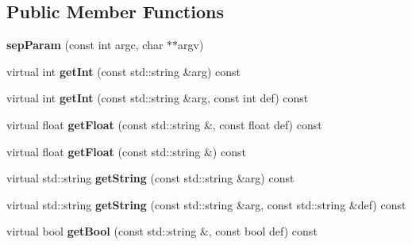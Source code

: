 \subsection*{Public Member Functions}
\begin{DoxyCompactItemize}
\item 
\mbox{\label{class_s_e_p_1_1sep_param_a2c29834aad5e722f9223eacdf05f807c}} 
{\bfseries sep\+Param} (const int argc, char $\ast$$\ast$argv)
\item 
\mbox{\label{class_s_e_p_1_1sep_param_a14317a60b4d164d038a4b701d6386b70}} 
virtual int {\bfseries get\+Int} (const std\+::string \&arg) const
\item 
\mbox{\label{class_s_e_p_1_1sep_param_adff7a506fa128bf7339d867fbe3c0634}} 
virtual int {\bfseries get\+Int} (const std\+::string \&arg, const int def) const
\item 
\mbox{\label{class_s_e_p_1_1sep_param_a25d7cfed0e22dd62d1618a9a2ab6f658}} 
virtual float {\bfseries get\+Float} (const std\+::string \&, const float def) const
\item 
\mbox{\label{class_s_e_p_1_1sep_param_a506e1a490b9c3cbe2b4ee130fec00503}} 
virtual float {\bfseries get\+Float} (const std\+::string \&) const
\item 
\mbox{\label{class_s_e_p_1_1sep_param_a7164131f7359873aad3bc9a44fb696e0}} 
virtual std\+::string {\bfseries get\+String} (const std\+::string \&arg) const
\item 
\mbox{\label{class_s_e_p_1_1sep_param_a692a693607aec2c859efe518364813ce}} 
virtual std\+::string {\bfseries get\+String} (const std\+::string \&arg, const std\+::string \&def) const
\item 
\mbox{\label{class_s_e_p_1_1sep_param_a78f9cc2e3c37ae928f8006c669a783c2}} 
virtual bool {\bfseries get\+Bool} (const std\+::string \&, const bool def) const
\item 
\mbox{\label{class_s_e_p_1_1sep_param_a7e77438d49178255fb660ca68833fca2}} 
$$
\end{DoxyCompactItemize}
